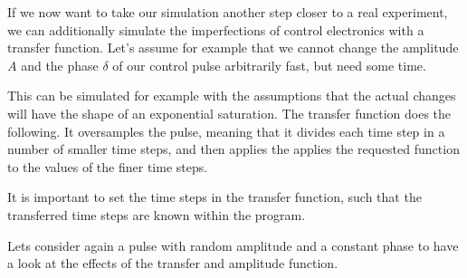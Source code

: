 \documentclass[letterpaper,10pt,english]{sphinxmanual}
\begin{document}
If we now want to take our simulation another step closer to a real experiment, we can additionally simulate the imperfections of control electronics with a transfer function. Let’s assume for example that we cannot change the amplitude \(A\) and the phase \(\delta\) of our control pulse arbitrarily fast, but need some time.

This can be simulated for example with the assumptions that the actual changes will have the shape of an exponential saturation. The transfer function does the following. It oversamples the pulse, meaning that it divides each time step in a number of smaller time steps, and then applies the applies the requested function to the values of the finer time steps.

{
\begin{sphinxVerbatim}[commandchars=\\\{\}]
\llap{\color{nbsphinxin}[2]:\,\hspace{\fboxrule}\hspace{\fboxsep}}   
  
  
  

  
       

\end{sphinxVerbatim}
}

It is important to set the time steps in the transfer function, such that the transferred time steps are known within the program.

Lets consider again a pulse with random amplitude and a constant phase to have a look at the effects of the transfer and amplitude function.
\end{document}
